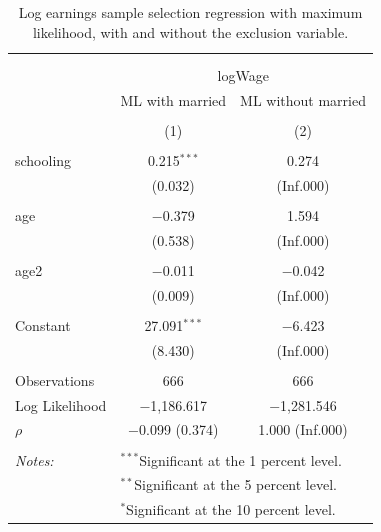 \documentclass[
]{article}
\begin{document}
\begin{table}[!htbp] \centering 
  \caption{Log earnings sample selection regression with maximum likelihood, 
          with and without the exclusion variable.} 
  \label{tab:q1_e} 
\small 
\begin{tabular}{@{\extracolsep{5pt}}lcc} 
\\[-1.8ex]\hline 
\hline \\[-1.8ex] 
\\[-1.8ex] & \multicolumn{2}{c}{logWage} \\ 
 & ML with married & ML without married \\ 
\\[-1.8ex] & (1) & (2)\\ 
\hline \\[-1.8ex] 
 schooling & 0.215$^{***}$ & 0.274 \\ 
  & (0.032) & (Inf.000) \\ 
  & & \\ 
 age & $-$0.379 & 1.594 \\ 
  & (0.538) & (Inf.000) \\ 
  & & \\ 
 age2 & $-$0.011 & $-$0.042 \\ 
  & (0.009) & (Inf.000) \\ 
  & & \\ 
 Constant & 27.091$^{***}$ & $-$6.423 \\ 
  & (8.430) & (Inf.000) \\ 
  & & \\ 
Observations & 666 & 666 \\ 
Log Likelihood & $-$1,186.617 & $-$1,281.546 \\ 
$\rho$ & $-$0.099  (0.374) & 1.000  (Inf.000) \\ 
\hline \\[-1.8ex] 
\textit{Notes:} & \multicolumn{2}{l}{$^{***}$Significant at the 1 percent level.} \\ 
 & \multicolumn{2}{l}{$^{**}$Significant at the 5 percent level.} \\ 
 & \multicolumn{2}{l}{$^{*}$Significant at the 10 percent level.} \\ 
\end{tabular} 
\end{table}
\end{document}
